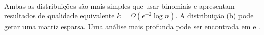 \paragraph{} Ambas as distribuições são mais simples que usar binomiais e apresentam resultados de qualidade equivalente $k = \Omega(\epsilon^{-2}\log{n})$. A distribuição (b) pode gerar uma matriz esparsa. Uma análise mais profunda pode ser encontrada em \cite{achlioptas_2003}
e \cite{bingham_2001}.
